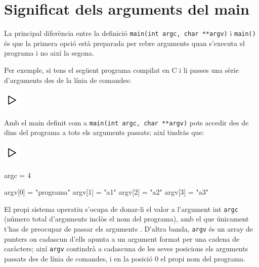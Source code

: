 \documentclass[]{book}
\newenvironment{Shaded}{\begin{snugshade}}{\end{snugshade}}
\newcommand{\DecValTok}[1]{\textcolor[rgb]{0.00,0.00,0.81}{#1}}
\newcommand{\NormalTok}[1]{#1}
\newcommand{\StringTok}[1]{\textcolor[rgb]{0.31,0.60,0.02}{#1}}
\begin{document}
\hypertarget{significat-dels-arguments-del-main}{%
\section{Significat dels arguments del main}\label{significat-dels-arguments-del-main}}

La principal diferència entre la definició \texttt{main(int\ argc,\ char\ **argv)} i \texttt{main()} és que la primera opció està preparada per rebre arguments quan s'executa el programa i no així la segona.

Per exemple, si tens el següent programa compilat en C i li passes una sèrie d'arguments des de la línia de comandes:

\includegraphics{./img/play.png}

\begin{Shaded}
\end{Shaded}

Amb el main definit com a \texttt{main(int\ argc,\ char\ **argv)} pots accedir des de dins del programa a tots els arguments passats; així tindràs que:

\includegraphics{./img/play.png}

\begin{Shaded}
\begin{Highlighting}[]
\NormalTok{argc = }\DecValTok{4}

\NormalTok{argv[}\DecValTok{0}\NormalTok{] = }\StringTok{"programa"}
\NormalTok{argv[}\DecValTok{1}\NormalTok{] = }\StringTok{"a1"}
\NormalTok{argv[}\DecValTok{2}\NormalTok{] = }\StringTok{"a2"}
\NormalTok{argv[}\DecValTok{3}\NormalTok{] = }\StringTok{"a3"}
\end{Highlighting}
\end{Shaded}

El propi sistema operatiu s'ocupa de donar-li el valor a l'argument int \texttt{argc} (número total d'arguments inclòs el nom del programa), amb el que únicament t'has de preocupar de passar els arguments . D'altra banda, \texttt{argv} és un array de punters on cadascun d'ells apunta a un argument format per una cadena de caràcters; així \texttt{argv} contindrà a cadascuna de les seves posicions els arguments passats des de línia de comandes, i en la posició 0 el propi nom del programa.
\end{document}
